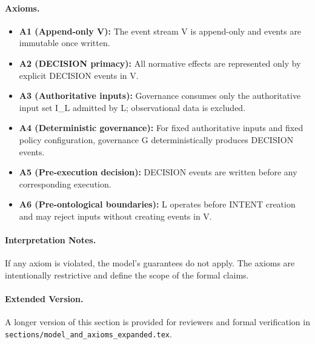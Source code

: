 \paragraph{Axioms.}
\begin{itemize}
  \item \textbf{A1 (Append-only V):} The event stream V is append-only and events are immutable once written.
  \item \textbf{A2 (DECISION primacy):} All normative effects are represented only by explicit DECISION events in V.
  \item \textbf{A3 (Authoritative inputs):} Governance consumes only the authoritative input set I\_L admitted by L; observational data is excluded.
  \item \textbf{A4 (Deterministic governance):} For fixed authoritative inputs and fixed policy configuration, governance G deterministically produces DECISION events.
  \item \textbf{A5 (Pre-execution decision):} DECISION events are written before any corresponding execution.
  \item \textbf{A6 (Pre-ontological boundaries):} L operates before INTENT creation and may reject inputs without creating events in V.
\end{itemize}

\paragraph{Interpretation Notes.}
If any axiom is violated, the model's guarantees do not apply. The axioms are intentionally restrictive and define the scope of the formal claims.

\paragraph{Extended Version.}
A longer version of this section is provided for reviewers and formal verification in \texttt{sections/model\_and\_axioms\_expanded.tex}.
